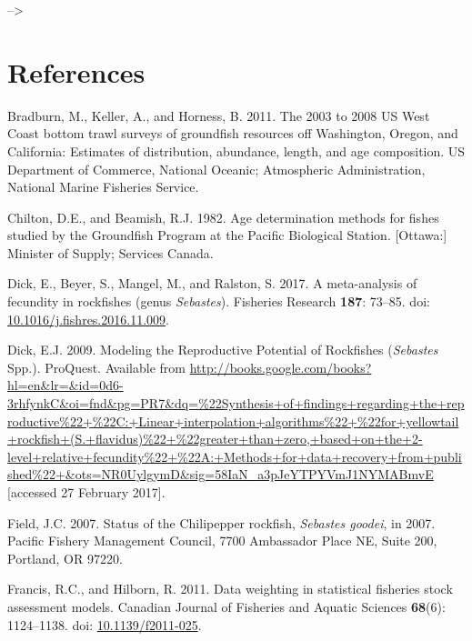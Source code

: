 \documentclass[12pt,]{article}
\begin{document}
\newpage

--\textgreater{} \color{black}

\section{References}\label{references}

\renewcommand{\thepage}{}

\hypertarget{refs}{}
\hypertarget{ref-bradburn_2003_2011}{}
Bradburn, M., Keller, A., and Horness, B. 2011. The 2003 to 2008 US West
Coast bottom trawl surveys of groundfish resources off Washington,
Oregon, and California: Estimates of distribution, abundance, length,
and age composition. US Department of Commerce, National Oceanic;
Atmospheric Administration, National Marine Fisheries Service.

\hypertarget{ref-chilton_age_1982}{}
Chilton, D.E., and Beamish, R.J. 1982. Age determination methods for
fishes studied by the Groundfish Program at the Pacific Biological
Station. {[}Ottawa:{]} Minister of Supply; Services Canada.

\hypertarget{ref-dick_meta-analysis_2017}{}
Dick, E., Beyer, S., Mangel, M., and Ralston, S. 2017. A meta-analysis
of fecundity in rockfishes (genus \emph{Sebastes}). Fisheries Research
\textbf{187}: 73--85. doi:
\href{https://doi.org/10.1016/j.fishres.2016.11.009}{10.1016/j.fishres.2016.11.009}.

\hypertarget{ref-dick_modeling_2009}{}
Dick, E.J. 2009. Modeling the Reproductive Potential of Rockfishes
(\emph{Sebastes} Spp.). ProQuest. Available from
\url{http://books.google.com/books?hl=en\&lr=\&id=0d6-3rhfynkC\&oi=fnd\&pg=PR7\&dq=\%22Synthesis+of+findings+regarding+the+reproductive\%22+\%22C:+Linear+interpolation+algorithms\%22+\%22for+yellowtail+rockfish+(S.+flavidus)\%22+\%22greater+than+zero,+based+on+the+2-level+relative+fecundity\%22+\%22A:+Methods+for+data+recovery+from+published\%22+\&ots=NR0UylgymD\&sig=58IaN_a3pJeYTPYVmJ1NYMABmvE}
{[}accessed 27 February 2017{]}.

\hypertarget{ref-field_status_2007}{}
Field, J.C. 2007. Status of the Chilipepper rockfish, \emph{Sebastes
goodei}, in 2007. Pacific Fishery Management Council, 7700 Ambassador
Place NE, Suite 200, Portland, OR 97220.

\hypertarget{ref-francis_data_2011}{}
Francis, R.C., and Hilborn, R. 2011. Data weighting in statistical
fisheries stock assessment models. Canadian Journal of Fisheries and
Aquatic Sciences \textbf{68}(6): 1124--1138. doi:
\href{https://doi.org/10.1139/f2011-025}{10.1139/f2011-025}.
\end{document}
